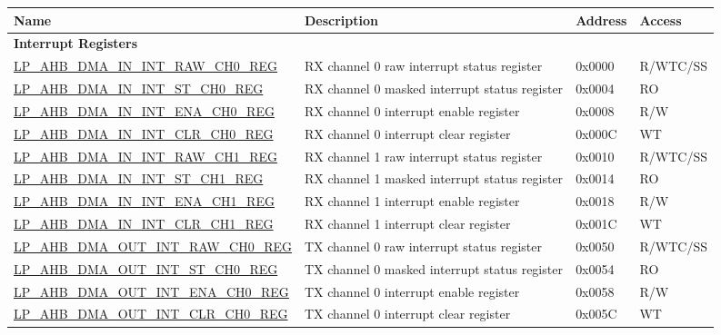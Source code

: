 \begin{longtable}{ | l | p{10cm} | p{1.3cm} | l | }
\hline\rowcolor{lightgray}
\textbf{Name} & \textbf{Description} &  \textbf{Address} & \textbf{Access} \\ \hline
\endhead
\multicolumn{4}{|l|}{\textbf{Interrupt Registers}} \\ \hline
\hyperref[regdesc:LPAHBDMAININTRAWCHNREG]{LP\_AHB\_DMA\_IN\_INT\_RAW\_CH0\_REG} & RX channel 0 raw interrupt status register & 0x0000 & R/WTC/SS \\ \hline
\hyperref[regdesc:LPAHBDMAININTSTCHNREG]{LP\_AHB\_DMA\_IN\_INT\_ST\_CH0\_REG} & RX channel 0 masked interrupt status register & 0x0004 & RO \\ \hline
\hyperref[regdesc:LPAHBDMAININTENACHNREG]{LP\_AHB\_DMA\_IN\_INT\_ENA\_CH0\_REG} & RX channel 0 interrupt enable register & 0x0008 & R/W \\ \hline
\hyperref[regdesc:LPAHBDMAININTCLRCHNREG]{LP\_AHB\_DMA\_IN\_INT\_CLR\_CH0\_REG} & RX channel 0 interrupt clear register & 0x000C & WT \\ \hline
\hyperref[regdesc:LPAHBDMAININTRAWCHNREG]{LP\_AHB\_DMA\_IN\_INT\_RAW\_CH1\_REG} & RX channel 1 raw interrupt status register & 0x0010 & R/WTC/SS \\ \hline
\hyperref[regdesc:LPAHBDMAININTSTCHNREG]{LP\_AHB\_DMA\_IN\_INT\_ST\_CH1\_REG} & RX channel 1 masked interrupt status register & 0x0014 & RO \\ \hline
\hyperref[regdesc:LPAHBDMAININTENACHNREG]{LP\_AHB\_DMA\_IN\_INT\_ENA\_CH1\_REG} & RX channel 1 interrupt enable register & 0x0018 & R/W \\ \hline
\hyperref[regdesc:LPAHBDMAININTCLRCHNREG]{LP\_AHB\_DMA\_IN\_INT\_CLR\_CH1\_REG} & RX channel 1 interrupt clear register & 0x001C & WT \\ \hline
\hyperref[regdesc:LPAHBDMAOUTINTRAWCHNREG]{LP\_AHB\_DMA\_OUT\_INT\_RAW\_CH0\_REG} & TX channel 0 raw interrupt status register & 0x0050 & R/WTC/SS \\ \hline
\hyperref[regdesc:LPAHBDMAOUTINTSTCHNREG]{LP\_AHB\_DMA\_OUT\_INT\_ST\_CH0\_REG} & TX channel 0 masked interrupt status register & 0x0054 & RO \\ \hline
\hyperref[regdesc:LPAHBDMAOUTINTENACHNREG]{LP\_AHB\_DMA\_OUT\_INT\_ENA\_CH0\_REG} & TX channel 0 interrupt enable register & 0x0058 & R/W \\ \hline
\hyperref[regdesc:LPAHBDMAOUTINTCLRCHNREG]{LP\_AHB\_DMA\_OUT\_INT\_CLR\_CH0\_REG} & TX channel 0 interrupt clear register & 0x005C & WT \\ \hline

\end{longtable}
